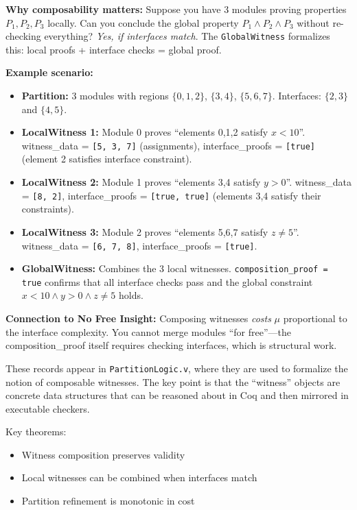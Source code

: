 \textbf{Why composability matters:} Suppose you have 3 modules proving properties $P_1, P_2, P_3$ locally. Can you conclude the global property $P_1 \land P_2 \land P_3$ without re-checking everything? \textit{Yes, if interfaces match}. The \texttt{GlobalWitness} formalizes this: local proofs + interface checks = global proof.

\textbf{Example scenario:}
\begin{itemize}
    \item \textbf{Partition:} 3 modules with regions $\{0,1,2\}$, $\{3,4\}$, $\{5,6,7\}$. Interfaces: $\{2,3\}$ and $\{4,5\}$.
    \item \textbf{LocalWitness 1:} Module 0 proves ``elements 0,1,2 satisfy $x < 10$''. witness\_data = \texttt{[5, 3, 7]} (assignments), interface\_proofs = \texttt{[true]} (element 2 satisfies interface constraint).
    \item \textbf{LocalWitness 2:} Module 1 proves ``elements 3,4 satisfy $y > 0$''. witness\_data = \texttt{[8, 2]}, interface\_proofs = \texttt{[true, true]} (elements 3,4 satisfy their constraints).
    \item \textbf{LocalWitness 3:} Module 2 proves ``elements 5,6,7 satisfy $z \neq 5$''. witness\_data = \texttt{[6, 7, 8]}, interface\_proofs = \texttt{[true]}.
    \item \textbf{GlobalWitness:} Combines the 3 local witnesses. \texttt{composition\_proof = true} confirms that all interface checks pass and the global constraint $x < 10 \land y > 0 \land z \neq 5$ holds.
\end{itemize}

\textbf{Connection to No Free Insight:} Composing witnesses \textit{costs} $\mu$ proportional to the interface complexity. You cannot merge modules ``for free''---the composition\_proof itself requires checking interfaces, which is structural work.


These records appear in \texttt{PartitionLogic.v}, where they are used to formalize the notion of composable witnesses. The key point is that the ``witness'' objects are concrete data structures that can be reasoned about in Coq and then mirrored in executable checkers.

Key theorems:
\begin{itemize}
    \item Witness composition preserves validity
    \item Local witnesses can be combined when interfaces match
    \item Partition refinement is monotonic in cost
\end{itemize}

